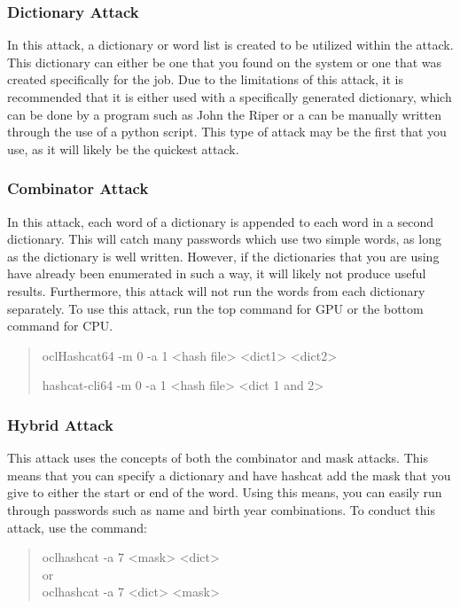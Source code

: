 \documentclass[a4paper,11pt]{report}
\begin{document}
			\subsubsection{Dictionary Attack}
				In this attack, a dictionary or word list is created to be utilized within the attack. 
				This dictionary can either be one that you found on the system or one that was created specifically for the job. 
				Due to the limitations of this attack, it is recommended that it is either used with a specifically generated dictionary, which can be done by a program such as John the Riper or
				a can be manually written through the use of a python script. 
				This type of attack may be the first that you use, as it will likely be the quickest attack. 
			\subsubsection{Combinator Attack}
				In this attack, each word of a dictionary is appended to each word in a second dictionary. 
				This will catch many passwords which use two simple words, as long as the dictionary is well written. 
				However, if the dictionaries that you are using have already been enumerated in such a way, it will likely not produce useful results. 
				Furthermore, this attack will not run the words from each dictionary separately. 
				To use this attack, run the top command for GPU or the bottom command for CPU. 
				\begin{quote}
					oclHashcat64 -m 0 -a 1 <hash file> <dict1> <dict2>
					
					hashcat-cli64 -m 0 -a 1 <hash file> <dict 1 and 2>
				\end{quote}
			\subsubsection{Hybrid Attack}
				This attack uses the concepts of both the combinator and mask attacks. 
				This means that you can specify a dictionary and have hashcat add the mask that you give to either the start or end of the word. 
				Using this means, you can easily run through passwords such as name and birth year combinations. 
				To conduct this attack, use the command:
				\begin{quote}
					oclhashcat -a 7 <mask> <dict>
					\\or\\
					oclhashcat -a 7 <dict> <mask>
				\end{quote}
				
\end{document}
